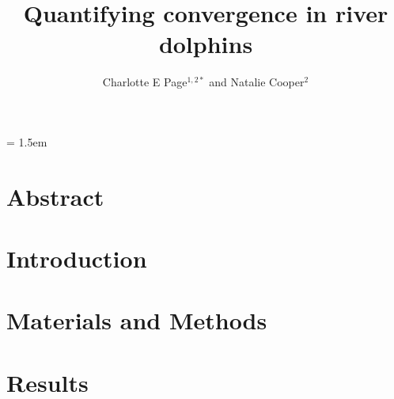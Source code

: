 \documentclass[12pt,a4paper]{article}
\title{Quantifying convergence in river dolphins}
\author{
	Charlotte E Page$^{1,2*}$ and Natalie Cooper$^{2}$
}
\date{}
\affiliation{\noindent{\footnotesize
	$^1$ Imperial\\ 
	$^2$ NHM\\
	$^*$Corresponding author\\
}}
\begin{document}
\mstitlepage
\parindent = 1.5em
\addtolength{\parskip}{.3em}

\section{Abstract}

	

\newpage
\raggedright
\doublespacing
\setlength{\parindent}{1cm}

\section{Introduction}

	
	
\section{Materials and Methods}

	

\section{Results} 
	


	
\end{document}
